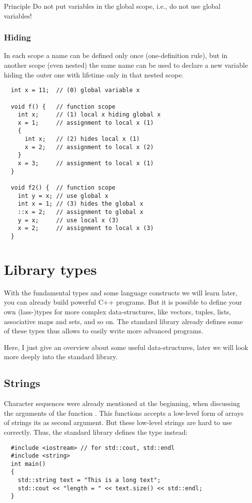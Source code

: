 \begin{guideline}{Principle}
  Do not put variables in the global scope, i.e., do not use global variables!
\end{guideline}

\subsubsection{Hiding}
In each scope a name can be defined only once (one-definition rule), but in another scope (even nested) the same name can be used to declare a new variable hiding the outer one with lifetime only in that nested scope.

\begin{verbatim}
  int x = 11;  // (0) global variable x

  void f() {   // function scope
    int x;     // (1) local x hiding global x
    x = 1;     // assignment to local x (1)
    {
      int x;   // (2) hides local x (1)
      x = 2;   // assignment to local x (2)
    }
    x = 3;     // assignment to local x (1)
  }

  void f2() {  // function scope
    int y = x; // use global x
    int x = 1; // (3) hides the global x
    ::x = 2;   // assignment to global x
    y = x;     // use local x (3)
    x = 2;     // assignment to local x (3)
  }
\end{verbatim}


\section{Library types}
With the fundamental types and some language constructs we will learn later, you can already build powerful C++ programs. But it is possible to define your own (lass-)types for more complex data-structures, like vectors, tuples, lists, associative maps and sets, and so on. The standard library already defines some of these types thus allows to easily write more advanced programs.

Here, I just give an overview about some useful data-structures, later we will look more deeply into the standard library.

\subsection{Strings}
Character sequences were already mentioned at the beginning, when discussing the arguments of the function . This functions accepts a low-level form of arrays of strings its as second argument. But these low-level strings are hard to use correctly. Thus, the standard library defines the type  instead:
\begin{verbatim}
  #include <iostream> // for std::cout, std::endl
  #include <string>
  int main()
  {
    std::string text = "This is a long text";
    std::cout << "length = " << text.size() << std::endl;
  }
\end{verbatim}

